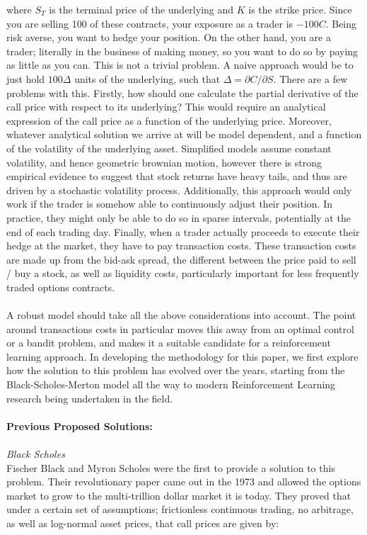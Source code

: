 \documentclass{article}
\begin{document}
where $S_T$ is the terminal price of the underlying and $K$ is the strike price. Since you are selling 100 of these contracts, your exposure as a trader is $-100C$. Being risk averse, you want to hedge your position. On the other hand, you are a trader; literally in the business of making money, so you want to do so by paying as little as you can. This is not a trivial problem. A naive approach would be to just hold $100\Delta$ units of the underlying, such that $\Delta = \partial C/\partial S$. There are a few problems with this. Firstly, how should one calculate the partial derivative of the call price with respect to its underlying? This would require an analytical expression of the call price as a function of the underlying price. Moreover, whatever analytical solution we arrive at will be model dependent, and a function of the volatility of the underlying asset. Simplified models assume constant volatility, and hence geometric brownian motion, however there is strong empirical evidence to suggest that stock returns have heavy tails, and thus are driven by a stochastic volatility process. Additionally, this approach would only work if the trader is somehow able to continuously adjust their position. In practice, they might only be able to do so in sparse intervals, potentially at the end of each trading day. Finally, when a trader actually proceeds to execute their hedge at the market, they have to pay transaction costs. These transaction costs are made up from the bid-ask spread, the different between the price paid to sell / buy a stock, as well as liquidity costs, particularly important for less frequently traded options contracts.\\\\
A robust model should take all the above considerations into account. The point around transactions costs in particular moves this away from an optimal control or a bandit problem, and makes it a suitable candidate for a reinforcement learning approach. In developing the methodology for this paper, we first explore how the solution to this problem has evolved over the years, starting from the Black-Scholes-Merton model all the way to modern Reinforcement Learning research being undertaken in the field.\\\\
\textbf{Previous Proposed Solutions:}\\\\
\textit{Black Scholes}\\Fischer Black and Myron Scholes were the first to provide a solution to this problem. Their revolutionary paper \cite{bsm} came out in the 1973 and allowed the options market to grow to the multi-trillion dollar market it is today. They proved that under a certain set of assumptions; frictionless continuous trading, no arbitrage, as well as log-normal asset prices, that call prices are given by:
\end{document}
